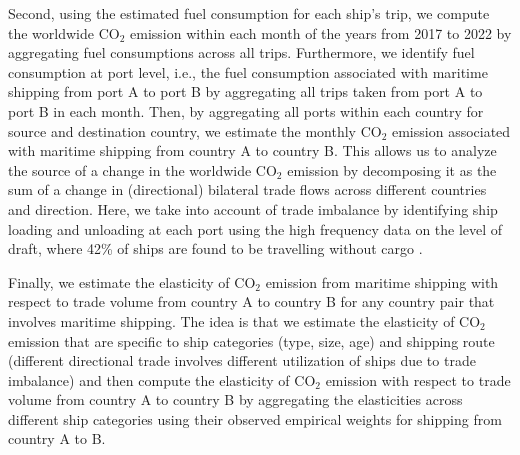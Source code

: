 \documentclass[hidelinks, 12pt,letterpaper]{article}
\begin{document}
Second, using the estimated fuel consumption for each ship's trip, we compute the worldwide CO$_2$ emission within each month of the years from 2017 to 2022 by aggregating fuel consumptions across all trips. Furthermore, we identify fuel consumption at port level, i.e., the fuel consumption associated with maritime shipping from port A to port B by aggregating all trips taken from port A to port B in each month.  Then, by aggregating all ports within each country for source and destination country, we estimate the monthly CO$_2$ emission associated with maritime shipping from country A to country B. 
This allows us to analyze the source of  a change in the worldwide CO$_2$ emission by decomposing it as the sum of a change in (directional) bilateral trade flows across different countries and direction. 
Here, we take into account of  trade  imbalance   by identifying ship loading and unloading at each port using the high frequency data on the level of draft, where 42\% of ships are found to be travelling without cargo \citep{brancaccio2020geography}.
  



Finally, we  estimate the elasticity of CO$_2$ emission from maritime shipping with respect to trade volume from country A to country B for any country pair that involves maritime shipping. The idea is that we estimate  the elasticity of CO$_2$ emission that are specific to ship categories (type, size, age) and shipping route (different directional trade involves different utilization of ships due to trade imbalance) and then compute the elasticity of CO$_2$ emission  with respect to trade volume from country A to country B by aggregating the elasticities across different ship categories using their observed empirical weights for shipping from country A to B.
\end{document}

